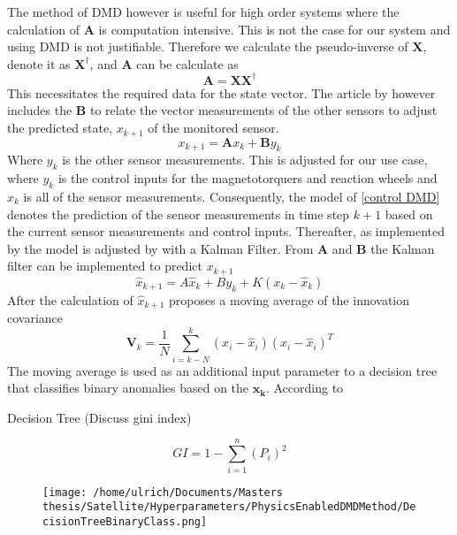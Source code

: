 \documentclass[letterpaper, 10 pt, conference]{ieeeconf}  %
\begin{document}
The method of DMD however is useful for high order systems where the calculation of $\mathbf{A}$ is computation intensive. This is not the case for our system and using DMD is not justifiable. Therefore we calculate the pseudo-inverse of $\mathbf{X}$, denote it as $\mathbf{X^{\dagger}}$, and $\mathbf{A}$ can be calculate as
\begin{equation}
	\mathbf{A} = \mathbf{X}\mathbf{X^{\dagger}}
\end{equation}
This necessitates the required data for the state vector. The article by \textcite{DeSilva2020} however includes the $\mathbf{B}$ to relate the vector measurements of the other sensors to adjust the predicted state, $x_{k+1}$ of the monitored sensor. 
\begin{equation}
	x_{k+1} = \boldsymbol{A}x_k + \boldsymbol{B}y_k
	\label{control DMD}
\end{equation}
Where $y_k$ is the other sensor measurements. This is adjusted for our use case, where $y_k$ is the control inputs for the magnetotorquers and reaction wheels and $x_k$ is all of the sensor measurements. Consequently, the model of \ref{control DMD} denotes the prediction of the sensor measurements in time step $k+1$ based on the current sensor measurements and control inputs.
Thereafter, as implemented by \textcite{DeSilva2020} the model is adjusted by with a Kalman Filter. From $\boldsymbol{A}$ and $\boldsymbol{B}$ the Kalman filter can be implemented to predict $x_{k+1}$
\begin{equation}
	\hat{x}_{k+1} = A\hat{x}_k + By_k + K(x_k - \hat{x}_k)
\end{equation}
After  the calculation of $\hat{x}_{k+1}$ \textcite{DeSilva2020} proposes a moving average of the innovation covariance
\begin{equation}
	\boldsymbol{V}_k = \frac{1}{N} \sum_{i=k-N}^k (x_i - \hat{x}_i)(x_i - \hat{x}_i)^T
\end{equation}
The moving average is used as an additional input parameter to a decision tree that classifies binary anomalies based on the $\boldsymbol{x_k}$. According to

Decision Tree (Discuss gini index)

\begin{equation}
GI = 1 - \sum_{i = 1}^{n}{(P_i)^2}
\end{equation}

\begin{figure}[!htb]
\texttt{[image: /home/ulrich/Documents/Masters thesis/Satellite/Hyperparameters/PhysicsEnabledDMDMethod/DecisionTreeBinaryClass.png]}
\end{figure}
\end{document}
